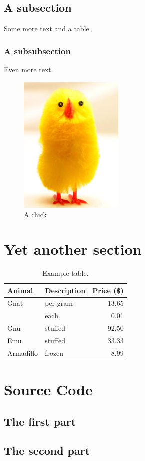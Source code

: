 \documentclass[12pt]{article} %
\begin{document}
\subsection{A subsection}

Some more text and a table. \\


\subsubsection{A subsubsection}

Even more text.

\begin{figure}[h]
    \centering
    \label{figure:chick}
    \includegraphics{figure1.png}
    \caption{A chick}
\end{figure}

\section{Yet another section}

\centering
\begin{table}[h]
    \centering
    \label{table:ex}
    \begin{tabular}{llr}
        \toprule
        Animal    & Description & Price (\$) \\
        \midrule
        Gnat      & per gram    & 13.65      \\
                  & each        & 0.01       \\
        Gnu       & stuffed     & 92.50      \\
        Emu       & stuffed     & 33.33      \\
        Armadillo & frozen      & 8.99       \\
        \bottomrule
    \end{tabular}
    \caption{Example table.}
\end{table}


\pagebreak
\appendix

\section{Source Code}
\subsection{The first part}


\subsection{The second part}

\end{document}
